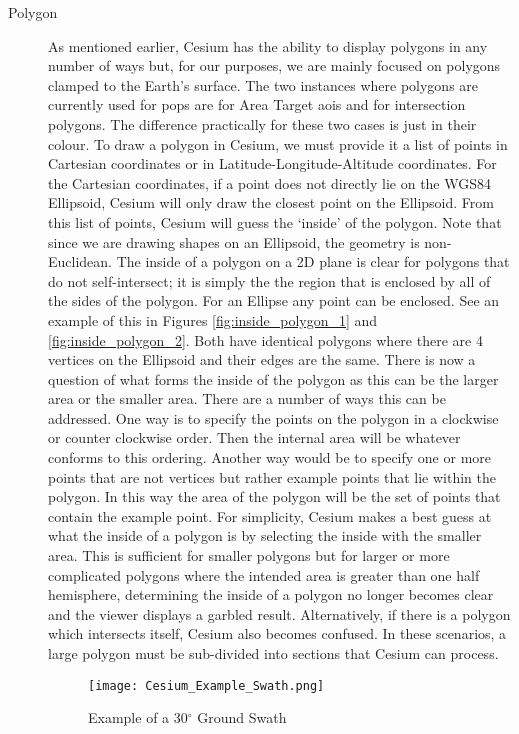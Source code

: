\begin{description}
    \item[Polygon] As mentioned earlier, Cesium has the ability to display
	polygons in any number of ways but, for our purposes, we are mainly
	focused on polygons clamped to the Earth's surface. The two instances
	where polygons are currently used for \gls{pops} are for Area Target
	\glspl{aoi} and for intersection polygons. The difference practically
	for these two cases is just in their colour. To draw a polygon in
	Cesium, we must provide it a list of points in Cartesian coordinates or
	in Latitude-Longitude-Altitude coordinates. For the Cartesian
	coordinates, if a point does not directly lie on the WGS84 Ellipsoid,
	Cesium will only draw the closest point on the Ellipsoid. From this
	list of points, Cesium will guess the `inside' of the polygon. Note
	that since we are drawing shapes on an Ellipsoid, the geometry is
	non-Euclidean. The inside of a polygon on a 2D plane is clear for
	polygons that do not self-intersect; it is simply the the region that
	is enclosed by all of the sides of the polygon. For an Ellipse any
	point can be enclosed. See an example of this in Figures
	\ref{fig:inside_polygon_1} and \ref{fig:inside_polygon_2}. Both have
	identical polygons where there are 4 vertices on the Ellipsoid and
	their edges are the same. There is now a question of what forms the
	inside of the polygon as this can be the larger area or the smaller
	area. There are a number of ways this can be addressed. One way is to
	specify the points on the polygon in a clockwise or counter clockwise
	order. Then the internal area will be whatever conforms to this
	ordering. Another way would be to specify one or more points that are
	not vertices but rather example points that lie within the polygon. In
	this way the area of the polygon will be the set of points that contain
	the example point. For simplicity, Cesium makes a best guess at what
	the inside of a polygon is by selecting the inside with the smaller
	area. This is sufficient for smaller polygons but for larger or more
	complicated polygons where the intended area is greater than one half
	hemisphere, determining the inside of a polygon no longer becomes clear
	and the viewer displays a garbled result. Alternatively, if there is a
	polygon which intersects itself, Cesium also becomes confused. In these
	scenarios, a large polygon must be sub-divided into sections that
	Cesium can process.

\begin{figure}
    \centering
    \texttt{[image: Cesium\_Example\_Swath.png]} 
    \caption{Example of a 30$^\circ$ Ground Swath}
    \label{fig:cesium_swath}
\end{figure}


\end{description}
